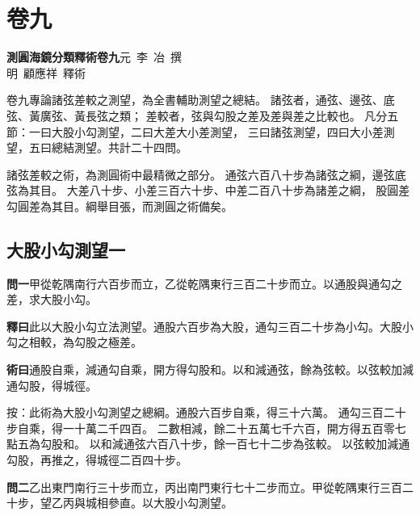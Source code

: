 \documentclass[12pt,a4paper]{article}
\newcommand{\Volume}[1]{\newpage\section*{卷#1}}
\newcommand{\Section}[1]{\subsection*{#1}}
\begin{document}
\Volume{九}

\noindent\textbf{測圓海鏡分類釋術卷九}\quad 元~李~冶~撰\\
明~顧應祥~釋術

\vspace{1em}

\noindent
卷九專論諸弦差較之測望，為全書輔助測望之總結。
諸弦者，通弦、邊弦、底弦、黃廣弦、黃長弦之類；
差較者，弦與勾股之差及差與差之比較也。
凡分五節：一曰大股小勾測望，二曰大差大小差測望，
三曰諸弦測望，四曰大小差測望，五曰總結測望。共計二十四問。

\vspace{0.5em}

\noindent
諸弦差較之術，為測圓術中最精微之部分。
通弦六百八十步為諸弦之綱，邊弦底弦為其目。
大差八十步、小差三百六十步、中差二百八十步為諸差之綱，
股圓差勾圓差為其目。綱舉目張，而測圓之術備矣。

\Section{大股小勾測望一}

\noindent\textbf{問一}\quad 甲從乾隅南行六百步而立，乙從乾隅東行三百二十步而立。以通股與通勾之差，求大股小勾。

\vspace{0.3em}

\noindent\textbf{釋曰}\quad 此以大股小勾立法測望。通股六百步為大股，通勾三百二十步為小勾。大股小勾之相較，為勾股之極差。

\vspace{0.3em}

\noindent\textbf{術曰}\quad 通股自乘，減通勾自乘，開方得勾股和。以和減通弦，餘為弦較。以弦較加減通勾股，得城徑。

\vspace{0.3em}

\noindent
按：此術為大股小勾測望之總綱。通股六百步自乘，得三十六萬。
通勾三百二十步自乘，得一十萬二千四百。
二數相減，餘二十五萬七千六百，開方得五百零七點五為勾股和。
以和減通弦六百八十步，餘一百七十二步為弦較。
以弦較加減通勾股，再推之，得城徑二百四十步。

\vspace{0.5em}

\noindent\textbf{問二}\quad 乙出東門南行三十步而立，丙出南門東行七十二步而立。甲從乾隅東行三百二十步，望乙丙與城相參直。以大股小勾測望。
\end{document}
